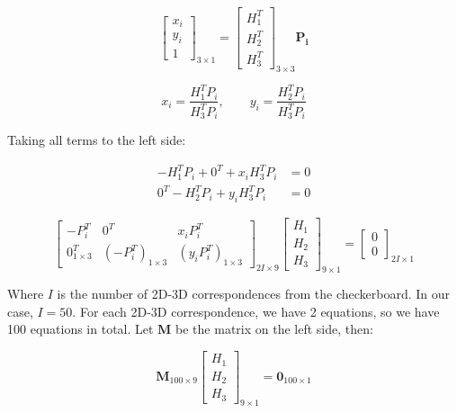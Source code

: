 \documentclass{article}
\begin{document}
\begin{equation}
    \begin{bmatrix}
    x_i \\ y_i \\ 1
    \end{bmatrix}_{3\times1} = \begin{bmatrix}H_{1}^{T} \\ H_{2}^{T} \\ H_{3}^{T}\end{bmatrix}_{3\times3}
    \mathbf{P_i}
\end{equation}

\begin{equation}
    x_i = \frac{H_{1}^{T} P_i}{H_{3}^{T} P_i},\qquad
    y_i = \frac{H_{2}^{T} P_i}{H_{3}^{T} P_i}
\end{equation}

Taking all terms to the left side:

\begin{align}
    -H_{1}^T P_i + 0^T + x_i H_{3}^T P_i &= 0 \\
    0^T - H_2^T P_i + y_i H_{3}^T P_i &= 0
\end{align}

\begin{equation}
    \begin{bmatrix}
    -P_{i}^T & 0^T & x_i P_{i}^T \\
    0^T_{1\times3} & (-P_i^T)_{1\times3} & (y_i P_{i}^T)_{1\times3}
    \end{bmatrix}_{2 \mathit{I}\times9}
    \begin{bmatrix}
    H_{1} \\ H_{2} \\ H_{3}
    \end{bmatrix}_{9\times1} = \begin{bmatrix}
    0 \\ 0
    \end{bmatrix}_{2 \mathit{I}\times1}
\end{equation}

Where $\mathit{I}$ is the number of 2D-3D correspondences from the checkerboard. In our case, $\mathit{I} = 50$. For each 2D-3D correspondence, we have 2 equations, so we have 100 equations in total. 
Let $\mathbf{M}$ be the matrix on the left side, then:

\begin{equation}
    \mathbf{M}_{100 \times 9} \begin{bmatrix} H_1 \\ H_2 \\ H_3 \end{bmatrix}_{9 \times 1} = \mathbf{0}_{100 \times 1}
\end{equation}
\end{document}
